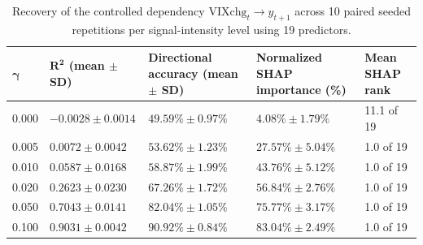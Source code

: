 \begin{table}[h]
	\caption{Recovery of the controlled dependency \(\mathrm{VIXchg}_t \rightarrow y_{t+1}\) across 10 paired seeded repetitions per signal-intensity level using 19 predictors.}
	\label{tab:signal_recovery}
	\setlength{\tabcolsep}{3pt}
	\centering
	\begin{tabular}{p{40pt}p{100pt}p{110pt}p{100pt}p{80pt}}
		\hline
		\(\boldsymbol{\gamma}\) &
		\(\boldsymbol{R^2}\) \textbf{(mean \(\boldsymbol{\pm}\) SD)} &
		\textbf{Directional accuracy (mean \(\boldsymbol{\pm}\) SD)} &
		\textbf{Normalized SHAP importance (\%)} &
		\textbf{Mean SHAP rank} \\
		\hline

		0.000 &
		\(-0.0028\pm0.0014\) &
		\(49.59\%\pm0.97\%\) &
		\(4.08\%\pm1.79\%\) &
		11.1 of 19 \\

		
		0.005 &
		\(0.0072\pm0.0042\) &
		\(53.62\%\pm1.23\%\) &
		\(27.57\%\pm5.04\%\) &
		1.0 of 19 \\

		
		0.010 &
		\(0.0587\pm0.0168\) &
		\(58.87\%\pm1.99\%\) &
		\(43.76\%\pm5.12\%\) &
		1.0 of 19 \\

		
		0.020 &
		\(0.2623\pm0.0230\) &
		\(67.26\%\pm1.72\%\) &
		\(56.84\%\pm2.76\%\) &
		1.0 of 19 \\

		
		0.050 &
		\(0.7043\pm0.0141\) &
		\(82.04\%\pm1.05\%\) &
		\(75.77\%\pm3.17\%\) &
		1.0 of 19 \\

		
		0.100 &
		\(0.9031\pm0.0042\) &
		\(90.92\%\pm0.84\%\) &
		\(83.04\%\pm2.49\%\) &
		1.0 of 19 \\

		\hline
	\end{tabular}
	\footnotesize
\end{table}
